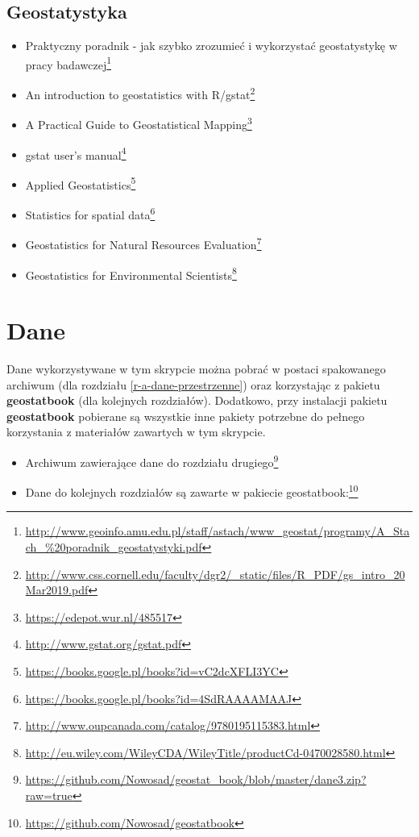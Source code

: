 \documentclass[
  paper=6in:9in,pagesize=pdftex,headinclude=on,footinclude=on,10pt]{scrbook}
\providecommand{\tightlist}{%
  \setlength{\itemsep}{0pt}\setlength{\parskip}{0pt}}
\renewcommand{\href}[2]{#2 (\url{#1})}
\renewcommand{\href}[2]{#2\footnote{\url{#1}}}
\begin{document}
\section{Geostatystyka}\label{geostatystyka-1}

\begin{itemize}
\tightlist
\item
  \href{http://www.geoinfo.amu.edu.pl/staff/astach/www_geostat/programy/A_Stach_\%20poradnik_geostatystyki.pdf}{Praktyczny poradnik - jak szybko zrozumieć i wykorzystać geostatystykę w pracy badawczej} \citep{stachpraktyczny}
\item
  \href{http://www.css.cornell.edu/faculty/dgr2/_static/files/R_PDF/gs_intro_20Mar2019.pdf}{An introduction to geostatistics with R/gstat} \citep{rossiter2016introduction}
\item
  \href{https://edepot.wur.nl/485517}{A Practical Guide to Geostatistical Mapping} \citep{hengl2009practical}
\item
  \href{http://www.gstat.org/gstat.pdf}{gstat user's manual} \citep{pebesma2001gstat}
\item
  \href{https://books.google.pl/books?id=vC2dcXFLI3YC}{Applied Geostatistics} \citep{isaaks1989applied}
\item
  \href{https://books.google.pl/books?id=4SdRAAAAMAAJ}{Statistics for spatial data} \citep{cressie1992statistics}
\item
  \href{http://www.oupcanada.com/catalog/9780195115383.html}{Geostatistics for Natural Resources Evaluation} \citep{goovaerts1997geostatistics}
\item
  \href{http://eu.wiley.com/WileyCDA/WileyTitle/productCd-0470028580.html}{Geostatistics for Environmental Scientists} \citep{webster2007geostatistics}
\end{itemize}

\chapter{Dane}\label{dane-app}

Dane wykorzystywane w tym skrypcie można pobrać w postaci spakowanego archiwum (dla rozdziału \ref{r-a-dane-przestrzenne}) oraz korzystając z pakietu \textbf{geostatbook} (dla kolejnych rozdziałów).
Dodatkowo, przy instalacji pakietu \textbf{geostatbook} pobierane są wszystkie inne pakiety potrzebne do pełnego korzystania z materiałów zawartych w tym skrypcie.

\begin{itemize}
\tightlist
\item
  \href{https://github.com/Nowosad/geostat_book/blob/master/dane3.zip?raw=true}{Archiwum zawierające dane do rozdziału drugiego}
\item
  \href{https://github.com/Nowosad/geostatbook}{Dane do kolejnych rozdziałów są zawarte w pakiecie geostatbook:}
\end{itemize}
\end{document}
